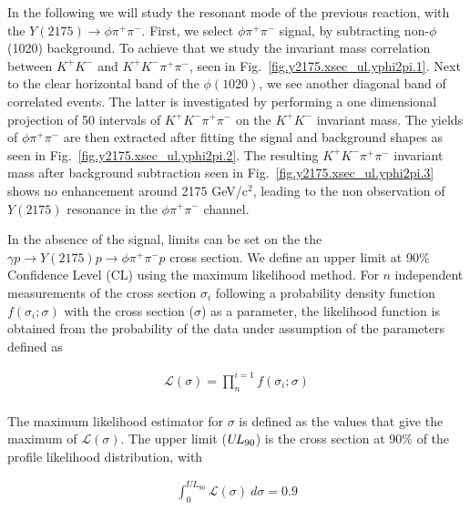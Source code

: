 In the following we will study the resonant mode of the previous reaction, with the $Y(2175) \rightarrow \phi \pi^{+} \pi^{-}$. First, we select $\phi \pi^+ \pi^-$ signal, by subtracting non-$\phi$(1020) background. To achieve that we study the invariant mass correlation between $K^{+}K^{-}$ and $K^{+}K^{-} \pi^+ \pi^-$, seen in Fig.~\ref{fig.y2175.xsec_ul.yphi2pi.1}. Next to the clear horizontal band of the $\phi(1020)$, we see another diagonal band of correlated events. The latter is investigated by performing a one dimensional projection of 50 intervals of $K^{+}K^{-} \pi^+ \pi^-$ on the $K^{+}K^{-}$ invariant mass. The yields of $\phi \pi^+ \pi^-$ are then extracted after fitting the signal and background shapes as seen in Fig.~\ref{fig.y2175.xsec_ul.yphi2pi.2}. The resulting $K^{+}K^{-} \pi^+ \pi^-$ invariant mass after background subtraction seen in Fig.~\ref{fig.y2175.xsec_ul.yphi2pi.3} shows no enhancement around 2175 GeV/c$^2$, leading to the non observation of $Y(2175)$ resonance in the $\phi \pi^+ \pi^-$ channel. 
~\par In the absence of the signal, limits can be set on the the $\gamma p \rightarrow Y(2175) p \rightarrow \phi \pi^{+} \pi^{-} p$ cross section. We define an upper limit at 90$\%$ Confidence Level (CL) using the maximum likelihood method. For $n$ independent measurements of the cross section $\sigma_{i}$ following a probability density function $f(\sigma_{i};\sigma)$ with the cross section ($\sigma$) as a parameter, the likelihood function is obtained from the probability of the data under assumption of the parameters defined as

\begin{equation}
    \label{eq.y2175.xsec_ul.yphi2pi.1}
    \begin{aligned}
        \mathcal{L(\sigma)} = \prod_{n}^{i=1} f(\sigma_{i};\sigma) \\
    \end{aligned}
\end{equation}

\noindent The maximum likelihood estimator for $\sigma$ is defined as the values that give the maximum of $\mathcal{L(\sigma)}$. The upper limit ($U\kern-0.14em L_{90}$) is the cross section at 90$\%$ of the profile likelihood distribution, with

\begin{equation}
    \label{eq.y2175.xsec_ul.yphi2pi.2}
    \begin{aligned}
        \int_{0}^{UL_{90}} \mathcal{L}(\sigma)~d\sigma = 0.9 \\
    \end{aligned}
\end{equation}

